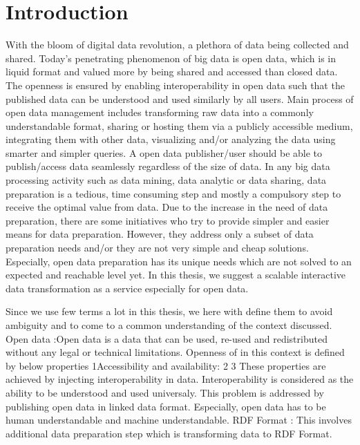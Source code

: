 
\chapter{Introduction} %
\label{Chapter1} %



\noindent With the bloom of digital data revolution, a plethora of data being collected and shared. Today’s penetrating phenomenon of big data is open data, which is in liquid format and valued more by being shared and accessed  than closed data. The openness is ensured by enabling interoperability in open data such that the published data can be understood and used similarly by all users. Main process of open data management includes transforming raw data into a commonly understandable format, sharing or hosting them via a publicly accessible medium, integrating them with other data, visualizing and/or analyzing the data using smarter and simpler queries. A open data publisher/user should be able to publish/access data seamlessly regardless of the size of data. In any big data processing activity such as data mining, data analytic or data sharing, data preparation is a tedious, time consuming step and mostly a compulsory step to receive the optimal value from data. Due to the increase in the need of data preparation, there are some initiatives who try to provide simpler and easier means for data preparation. However, they address only a subset of data preparation needs and/or they are not very simple and cheap solutions. Especially, open data preparation has its unique needs which are not solved to an expected and reachable level yet. In this thesis, we suggest a scalable interactive data transformation as a service especially for open data.

Since we use few terms a lot in this thesis, we here with define them to avoid ambiguity and to come to a common understanding of the context discussed. 
Open data :Open data is a data that can be used, re-used and redistributed without any legal or technical limitations. 
Openness of in this context is defined by below properties
1Accessibility and availability: 
2
3
These properties are achieved by injecting interoperability in data.
Interoperability is considered as the ability to be understood and used universaly. This problem is addressed by publishing open data in linked data format. Especially,  open data has to be human understandable and machine understandable. 
RDF Format : This involves additional data preparation step which is transforming data to RDF Format. 

